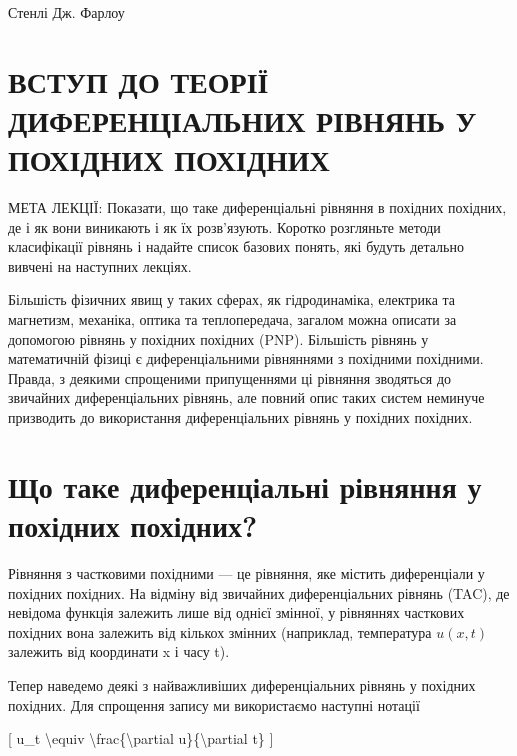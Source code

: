 \documentclass[
]{article}
\begin{document}
Стенлі Дж. Фарлоу

\section{ВСТУП ДО ТЕОРІЇ ДИФЕРЕНЦІАЛЬНИХ РІВНЯНЬ У ПОХІДНИХ
ПОХІДНИХ}\label{ux432ux441ux442ux443ux43f-ux434ux43e-ux442ux435ux43eux440ux456ux457-ux434ux438ux444ux435ux440ux435ux43dux446ux456ux430ux43bux44cux43dux438ux445-ux440ux456ux432ux43dux44fux43dux44c-ux443-ux43fux43eux445ux456ux434ux43dux438ux445-ux43fux43eux445ux456ux434ux43dux438ux445}

МЕТА ЛЕКЦІЇ: Показати, що таке диференціальні рівняння в похідних
похідних, де і як вони виникають і як їх розв'язують. Коротко розгляньте
методи класифікації рівнянь і надайте список базових понять, які будуть
детально вивчені на наступних лекціях.

Більшість фізичних явищ у таких сферах, як гідродинаміка, електрика та
магнетизм, механіка, оптика та теплопередача, загалом можна описати за
допомогою рівнянь у похідних похідних (PNP). Більшість рівнянь у
математичній фізиці є диференціальними рівняннями з похідними похідними.
Правда, з деякими спрощеними припущеннями ці рівняння зводяться до
звичайних диференціальних рівнянь, але повний опис таких систем неминуче
призводить до використання диференціальних рівнянь у похідних похідних.

\section{Що таке диференціальні рівняння у похідних
похідних?}\label{ux449ux43e-ux442ux430ux43aux435-ux434ux438ux444ux435ux440ux435ux43dux446ux456ux430ux43bux44cux43dux456-ux440ux456ux432ux43dux44fux43dux43dux44f-ux443-ux43fux43eux445ux456ux434ux43dux438ux445-ux43fux43eux445ux456ux434ux43dux438ux445}

Рівняння з частковими похідними --- це рівняння, яке містить
диференціали у похідних похідних. На відміну від звичайних
диференціальних рівнянь (TAC), де невідома функція залежить лише від
однієї змінної, у рівняннях часткових похідних вона залежить від кількох
змінних (наприклад, температура \(u(x, t)\) залежить від координати x і
часу t).

Тепер наведемо деякі з найважливіших диференціальних рівнянь у похідних
похідних. Для спрощення запису ми використаємо наступні нотації

{[} u\_t \textbackslash equiv
\textbackslash frac\{\textbackslash partial u\}\{\textbackslash partial
t\} {]}
\end{document}
